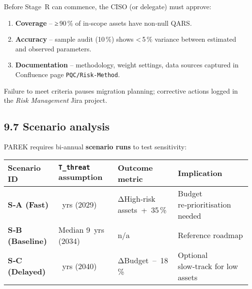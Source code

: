\documentclass[
  english,
]{article}
\providecommand{\tightlist}{%
  \setlength{\itemsep}{0pt}\setlength{\parskip}{0pt}}
\begin{document}
Before Stage~R can commence, the CISO (or delegate) must approve:

\begin{enumerate}
\def\labelenumi{\arabic{enumi}.}
\tightlist
\item
  \textbf{Coverage} -- ≥\,90\,\% of in‑scope assets have non‑null QARS.
\item
  \textbf{Accuracy} -- sample audit (10\,\%) shows \textless\,5\,\%
  variance between estimated and observed parameters.
\item
  \textbf{Documentation} -- methodology, weight settings, data sources
  captured in Confluence page \texttt{PQC/Risk‑Method}.
\end{enumerate}

Failure to meet criteria pauses migration planning; corrective actions
logged in the \emph{Risk Management} Jira project.

\subsection{9.7 Scenario analysis}\label{scenario-analysis}

PAREK requires bi‑annual \textbf{scenario runs} to test sensitivity:

\begin{longtable}[]{@{}
  >{\raggedright\arraybackslash}p{}
  >{\raggedright\arraybackslash}p{}
  >{\raggedright\arraybackslash}p{}
  >{\raggedright\arraybackslash}p{}@{}}
\toprule\noalign{}
\begin{minipage}[b]{\linewidth}\raggedright
Scenario ID
\end{minipage} & \begin{minipage}[b]{\linewidth}\raggedright
\texttt{T\_threat} assumption
\end{minipage} & \begin{minipage}[b]{\linewidth}\raggedright
Outcome metric
\end{minipage} & \begin{minipage}[b]{\linewidth}\raggedright
Implication
\end{minipage} \\
\midrule\noalign{}
\endhead
\bottomrule\noalign{}
\endlastfoot
\textbf{S‑A (Fast)} & 5~yrs (2029) & ΔHigh‑risk assets~+~35\,\% & Budget
re‑prioritisation needed \\
\textbf{S‑B (Baseline)} & Median 9~yrs (2034) & n/a & Reference
roadmap \\
\textbf{S‑C (Delayed)} & 15~yrs (2040) & ΔBudget~--~18\,\% & Optional
slow‑track for low assets \\
\end{longtable}
\end{document}
